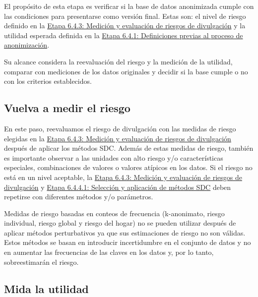 \documentclass[
]{book}
\theoremstyle{definition}
\theoremstyle{definition}
\theoremstyle{definition}
\theoremstyle{definition}
\theoremstyle{remark}
\begin{document}
El propósito de esta etapa es verificar si la base de datos anonimizada cumple con las condiciones para presentarse como versión final. Estas son: el nivel de riesgo definido en la \protect\hyperlink{etapa-6.4.3-mediciuxf3n-y-evaluaciuxf3n-de-riesgos-de-divulgaciuxf3n}{Etapa 6.4.3: Medición y evaluación de riesgos de divulgación} y la utilidad esperada definida en la \protect\hyperlink{etapa-6.4.1-definiciones-previas-al-proceso-de-anonimizaciuxf3n}{Etapa 6.4.1: Definiciones previas al proceso de anonimización}.

Su alcance considera la reevaluación del riesgo y la medición de la utilidad, comparar con mediciones de los datos originales y decidir si la base cumple o no con los criterios establecidos.

\hypertarget{vuelva-a-medir-el-riesgo}{%
\subsection{Vuelva a medir el riesgo}\label{vuelva-a-medir-el-riesgo}}

En este paso, reevaluamos el riesgo de divulgación con las medidas de riesgo elegidas en la \protect\hyperlink{etapa-6.4.3-mediciuxf3n-y-evaluaciuxf3n-de-riesgos-de-divulgaciuxf3n}{Etapa 6.4.3: Medición y evaluación de riesgos de divulgación} después de aplicar los métodos SDC. Además de estas medidas de riesgo, también es importante observar a las unidades con alto riesgo y/o características especiales, combinaciones de valores o valores atípicos en los datos. Si el riesgo no está en un nivel aceptable, la \protect\hyperlink{etapa-6.4.3-mediciuxf3n-y-evaluaciuxf3n-de-riesgos-de-divulgaciuxf3n}{Etapa 6.4.3: Medición y evaluación de riesgos de divulgación} y \protect\hyperlink{etapa-6.4.4.1-selecciuxf3n-y-aplicaciuxf3n-de-muxe9todos-sdc}{Etapa 6.4.4.1: Selección y aplicación de métodos SDC} deben repetirse con diferentes métodos y/o parámetros.

Medidas de riesgo basadas en conteos de frecuencia (k-anonimato, riesgo individual, riesgo global y riesgo del hogar) no se pueden utilizar después de aplicar métodos perturbativos ya que sus estimaciones de riesgo no son válidas. Estos métodos se basan en introducir incertidumbre en el conjunto de datos y no en aumentar las frecuencias de las claves en los datos y, por lo tanto, sobreestimarán el riesgo.

\hypertarget{mida-la-utilidad}{%
\subsection{Mida la utilidad}\label{mida-la-utilidad}}
\end{document}
